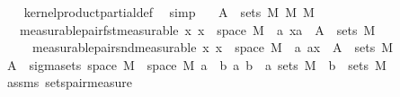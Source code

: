 \begin{isabellebody}
%
\isadelimproof
\ \ %
\endisadelimproof
%
\isatagproof
{}\isamarkupfalse%
\ kernel{\isacharunderscore}{\kern0pt}product{\isacharunderscore}{\kern0pt}partial{\isacharunderscore}{\kern0pt}def\ \isamarkupfalse%
\ simp%
\endisatagproof
{\isafoldproof}%
%
\isadelimproof
\isanewline
%
\endisadelimproof
\isanewline
{}\isamarkupfalse%
\isanewline
\ \ \ {\isachardoublequoteopen}A\ {\isasymin}\ sets\ {\isacharparenleft}{\kern0pt}M{}\ {\isasymOtimes}\isactrlsub M\ M{}{\isacharparenright}{\kern0pt}{\isachardoublequoteclose}\isanewline
\ \ \ measurable{\isacharunderscore}{\kern0pt}pair{\isacharunderscore}{\kern0pt}fst{\isacharbrackleft}{\kern0pt}measurable{\isacharbrackright}{\kern0pt}{\isacharcolon}{\kern0pt}\ {\isachardoublequoteopen}{\isasymAnd}x{\isachardot}{\kern0pt}\ x\ {\isasymin}\ space\ M{}\ {\isasymLongrightarrow}\ {\isacharbraceleft}{\kern0pt}a{\isachardot}{\kern0pt}\ {\isacharparenleft}{\kern0pt}x{\isacharcomma}{\kern0pt}a{\isacharparenright}{\kern0pt}\ {\isasymin}\ A{\isacharbraceright}{\kern0pt}\ {\isasymin}\ sets\ M{}{\isachardoublequoteclose}\isanewline
\ \ \ \ \ measurable{\isacharunderscore}{\kern0pt}pair{\isacharunderscore}{\kern0pt}snd{\isacharbrackleft}{\kern0pt}measurable{\isacharbrackright}{\kern0pt}{\isacharcolon}{\kern0pt}\ {\isachardoublequoteopen}{\isasymAnd}x{\isachardot}{\kern0pt}\ x\ {\isasymin}\ space\ M{}\ {\isasymLongrightarrow}\ {\isacharbraceleft}{\kern0pt}a{\isachardot}{\kern0pt}\ {\isacharparenleft}{\kern0pt}a{\isacharcomma}{\kern0pt}x{\isacharparenright}{\kern0pt}\ {\isasymin}\ A{\isacharbraceright}{\kern0pt}\ {\isasymin}\ sets\ M{}{\isachardoublequoteclose}\isanewline
%
\isadelimproof
%
\endisadelimproof
%
\isatagproof
{}\isamarkupfalse%
\ {\isacharminus}{\kern0pt}\isanewline
\ \ \isamarkupfalse%
\ {\isachardoublequoteopen}A\ {\isasymin}\ sigma{\isacharunderscore}{\kern0pt}sets\ {\isacharparenleft}{\kern0pt}space\ M{}\ {\isasymtimes}\ space\ M{}{\isacharparenright}{\kern0pt}\ {\isacharbraceleft}{\kern0pt}{\isacharparenleft}{\kern0pt}a\ {\isasymtimes}\ b{\isacharparenright}{\kern0pt}{\isacharbar}{\kern0pt}\ a\ b\ {\isachardot}{\kern0pt}\ a{\isasymin}\ sets\ M{}\ {\isasymand}\ b\ {\isasymin}\ sets\ M{}{\isacharbraceright}{\kern0pt}{\isachardoublequoteclose}\isanewline
\ \ \ \ \isamarkupfalse%
\ assms\ sets{\isacharunderscore}{\kern0pt}pair{\isacharunderscore}{\kern0pt}measure\ \isamarkupfalse%

\end{isabellebody}

